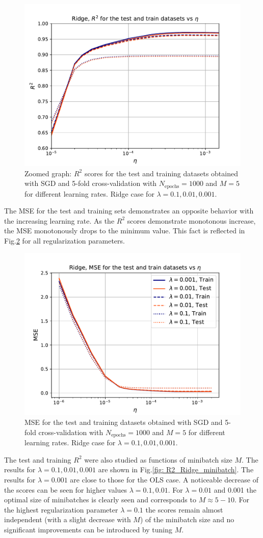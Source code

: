 \documentclass{emulateapj}
\begin{document}
\begin{figure}[h]
    \centering
    \includegraphics[width=.49\textwidth]{Figures/Ridge_R2_eta_zoom.pdf}
    \caption{Zoomed graph: $R^2$ scores for the test and training datasets obtained with SGD and 5-fold cross-validation with $N_{\mathrm{epochs}}=1000$ and $M=5$ for different learning rates. Ridge case for $\lambda=0.1,0.01,0.001$.}
    \label{fig: R2_Ridge_eta_zoom}
\end{figure}

The MSE for the test and training sets demonstrates an opposite behavior with the increasing learning rate. As the $R^2$ scores demonstrate monotonous increase, the MSE monotonously drops to the minimum value. This fact is reflected in Fig.\ref{fig: MSE_Ridge_eta} for all regularization parameters.

\begin{figure}[h]
    \centering
    \includegraphics[width=.49\textwidth]{Figures/Ridge_MSE_eta.pdf}
    \caption{MSE for the test and training datasets obtained with SGD and 5-fold cross-validation with $N_{\mathrm{epochs}}=1000$ and $M=5$ for different learning rates. Ridge case for $\lambda=0.1,0.01,0.001$.}
    \label{fig: MSE_Ridge_eta}
\end{figure}

The test and training $R^2$ were also studied as functions of minibatch size $M$. The results for $\lambda=0.1,0.01,0.001$ are shown in Fig.\ref{fig: R2_Ridge_minibatch}. The results for $\lambda=0.001$ are close to those for the OLS case. A noticeable decrease of the scores can be seen for higher values $\lambda=0.1,0.01$. For $\lambda=0.01$ and 0.001 the optimal size of minibatches is clearly seen and corresponds to $M\approx5-10$. For the highest regularization parameter $\lambda=0.1$ the scores remain almost independent (with a slight decrease with $M$) of the minibatch size and no significant improvements can be introduced by tuning $M$.
\end{document}
